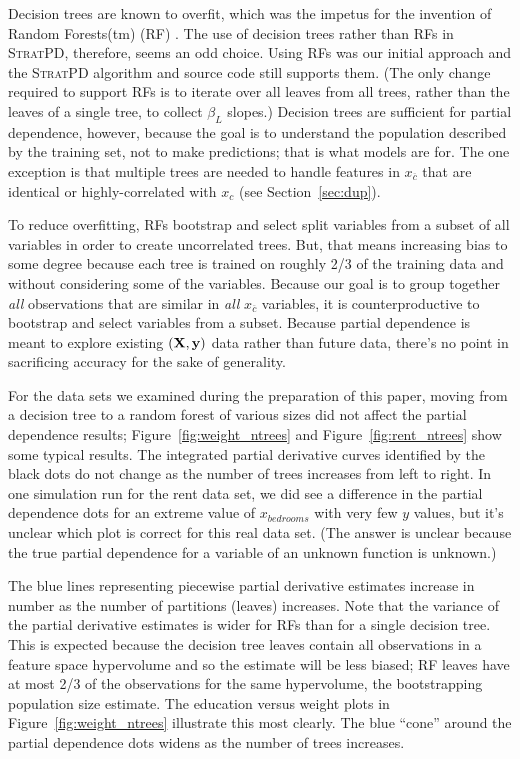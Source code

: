 \documentclass[12pt]{article}
\newcommand{\secref}[1]{Section~\ref{#1}}
\newcommand{\figref}[1]{Figure~\ref{#1}}
\newcommand{\spd}{\fontfamily{cmr}\textsc{\small StratPD}}
\newcommand{\xnc}{$x_{\overline{c}}$}
\begin{document}
Decision trees are known to overfit, which was the impetus for the invention of Random Forests(tm) (RF) \cite{RF}.  The use of decision trees rather than RFs in \spd, therefore, seems an odd choice. Using RFs was our initial approach and the \spd{} algorithm and source code still supports them. (The only change required to support RFs is to iterate over all leaves from all trees, rather than the leaves of a single tree, to collect $\beta_L$ slopes.)  Decision trees are sufficient for partial dependence, however, because the goal is to understand the population described by the training set, not to make predictions; that is what models are for. The one exception is that multiple trees are needed to handle features in \xnc{} that are identical or highly-correlated with $x_c$ (see \secref{sec:dup}).

To reduce overfitting, RFs bootstrap and select split variables from a subset of all variables in order to create uncorrelated trees. But, that means increasing bias to some degree because each tree is trained on roughly 2/3 of the training data and without considering some of the variables. Because our goal is to group together {\em all} observations that are similar in {\em all} \xnc{} variables, it is counterproductive to bootstrap and select variables from a subset. Because partial dependence is meant to explore existing $(\bf X, y)$ data rather than future data, there's no point in sacrificing accuracy for the sake of generality. 

For the data sets we examined during the preparation of this paper, moving from a decision tree to a random forest of various sizes did not affect the partial dependence results; \figref{fig:weight_ntrees} and \figref{fig:rent_ntrees} show some typical results. The integrated partial derivative curves identified by the black dots do not change as the number of trees increases from left to right.  In one simulation run for the rent data set, we did see a difference in the partial dependence dots for an extreme value of $x_{bedrooms}$ with very few $y$ values, but it's unclear which plot is correct for this real data set. (The answer is unclear because the true partial dependence for a variable of an unknown function is unknown.)

The blue lines representing piecewise partial derivative estimates increase in number as the number of partitions (leaves) increases.  Note that the variance of the partial derivative estimates is wider for RFs than for a single decision tree. This is expected because the decision tree leaves contain all observations in a feature space hypervolume and so the estimate will be less biased; RF leaves have at most 2/3 of the observations for the same hypervolume, the bootstrapping population size estimate. The education versus weight plots in \figref{fig:weight_ntrees} illustrate this most clearly. The blue ``cone'' around the partial dependence dots widens as the number of trees increases.  
\end{document}
